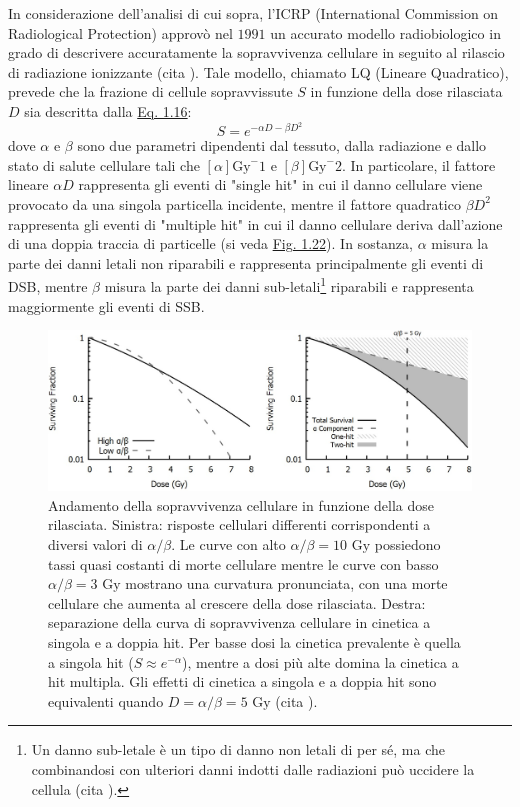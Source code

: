 \documentclass[12pt,a4paper,twoside]{report}
\begin{document}
	In considerazione dell'analisi di cui sopra, l'ICRP (International Commission on Radiological Protection) approvò nel $1991$ un accurato modello radiobiologico in grado di descrivere accuratamente la sopravvivenza cellulare in seguito al rilascio di radiazione ionizzante (cita
	). Tale modello, chiamato LQ (Lineare Quadratico), prevede che la frazione di cellule sopravvissute $S$ in funzione della dose rilasciata $D$ sia descritta dalla \hyperref[eq:survival2]{Eq. 1.16}:
	\begin{equation}
		S=e^{-\alpha D-\beta D^2}
		\label{eq:survival2}
	\end{equation}
	dove $\alpha$ e $\beta$ sono due parametri dipendenti dal tessuto, dalla radiazione e dallo stato di salute cellulare tali che $\left[\alpha\right]\mbox{Gy}^-1$ e $\left[\beta\right]\mbox{Gy}^-2$. In particolare, il fattore lineare $\alpha D$ rappresenta gli eventi di "single hit" in cui il danno cellulare viene provocato da una singola particella incidente, mentre il fattore quadratico $\beta D^2$ rappresenta gli eventi di "multiple hit" in cui il danno cellulare deriva dall'azione di una doppia traccia di particelle (si veda \hyperref[fig:survival_cell]{Fig. 1.22}). In sostanza, $\alpha$ misura la parte dei danni letali non riparabili e rappresenta principalmente gli eventi di DSB, mentre $\beta$ misura la parte dei danni sub-letali\footnote{Un danno sub-letale è un tipo di danno non letali di per sé, ma che combinandosi con ulteriori danni indotti dalle radiazioni può uccidere la cellula (cita
		).} riparabili e rappresenta maggiormente gli eventi di SSB.
	
	\begin{figure}[H]
		\centering
		\includegraphics[width=0.9\linewidth]{survival_cell.jpg}
		\caption{Andamento della sopravvivenza cellulare in funzione della dose rilasciata. Sinistra: risposte cellulari differenti corrispondenti a diversi valori di $\alpha/\beta$. Le curve con alto $\alpha/\beta=10\mbox{ Gy}$ possiedono tassi quasi costanti di morte cellulare mentre le curve con basso $\alpha/\beta=3\mbox{ Gy}$ mostrano una curvatura pronunciata, con una morte cellulare che aumenta al crescere della dose rilasciata. Destra: separazione della curva di sopravvivenza cellulare in cinetica a singola e a doppia hit. Per basse dosi la cinetica prevalente è quella a singola hit ($S\approx e^{-\alpha}$), mentre a dosi più alte domina la cinetica a hit multipla. Gli effetti di cinetica a singola e a doppia hit sono equivalenti quando $D=\alpha/\beta=5\mbox{ Gy}$ (cita
			).}
		\label{fig:survival_cell}
	\end{figure}
		
\end{document}
